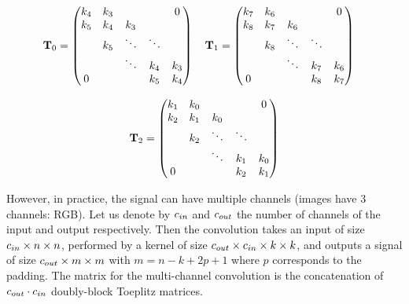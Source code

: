 \begin{equation*}
  \Tmat_0 = \leftmatrix
    k_4 & k_3 &         &         & 0       \\
    k_5 & k_4 & k_3 &         &         \\
            & k_5 & \ddots  & \ddots  &         \\
            &         & \ddots  & k_4 & k_3 \\
    0       &         &         & k_5 & k_4
  \rightmatrix \quad 
  \hfill
  \Tmat_1 = \leftmatrix
    k_7 & k_6 &         &         & 0       \\
    k_8 & k_7 & k_6 &         &         \\
            & k_8 & \ddots  & \ddots  &         \\
            &         & \ddots  & k_7 & k_6 \\
    0       &         &         & k_8 & k_7 \\
  \rightmatrix \quad
\end{equation*}

\begin{equation*}
  \mathbf{T}_2 = \begin{pmatrix}
    k_1 & k_0 &         &         & 0       \\
    k_2 & k_1 & k_0 &         &         \\
            & k_2 & \ddots  & \ddots  &         \\
            &         & \ddots  & k_1 & k_0 \\
    0       &         &         & k_2 & k_1 \\
  \end{pmatrix}
\end{equation*}


However, in practice, the signal can have multiple channels (\eg images have 3 channels: RGB).
Let us denote by $c_{in}$ and $c_{out}$ the number of channels of the input and output respectively.
Then the convolution takes an input of size $c_{in} \times n \times n$, performed by a kernel of size $c_{out} \times c_{in} \times k \times k$, and outputs a signal of size $c_{out} \times m \times m$ with $m = n - k + 2p + 1$ where $p$ corresponds to the padding.
The matrix for the multi-channel convolution is the concatenation of $c_{out} \cdot c_{in}$ doubly-block Toeplitz matrices.

